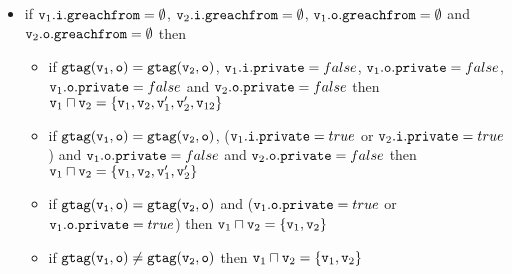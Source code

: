 \begin{itemize}
 \item if $\mathtt{v}_1.\mathtt{i}.\mathtt{greachfrom} = \emptyset$, $\mathtt{v}_2.\mathtt{i}.\mathtt{greachfrom} = \emptyset$, $\mathtt{v}_1.\mathtt{o}.\mathtt{greachfrom} = \emptyset$ and $\mathtt{v}_2.\mathtt{o}.\mathtt{greachfrom} = \emptyset$ then 
 \begin{itemize}
 \item if $\tt gtag(\mathtt{v}_1, o) = gtag(\mathtt{v}_2, o)$, $\mathtt{v}_1.\mathtt{i}.\mathtt{private} = false$, $\mathtt{v}_1.\mathtt{o}.\mathtt{private} = false$, $\mathtt{v}_1.\mathtt{o}.\mathtt{private} = false$ and $\mathtt{v}_2.\mathtt{o}.\mathtt{private} = false$ then  $\mathtt{v}_1 \sqcap \mathtt{v}_2 = \{\mathtt{v}_1,\mathtt{v}_2,\mathtt{v}_1',\mathtt{v}_2',\mathtt{v}_{12}\}$ %
    
    
   \item if $\tt gtag(\mathtt{v}_1, o) = gtag(\mathtt{v}_2, o)$, ($\mathtt{v}_1.\mathtt{i}.\mathtt{private} = true$ or $\mathtt{v}_2.\mathtt{i}.\mathtt{private} = true$) and $\mathtt{v}_1.\mathtt{o}.\mathtt{private} = false$ and $\mathtt{v}_2.\mathtt{o}.\mathtt{private} = false$ then  $\mathtt{v}_1 \sqcap \mathtt{v}_2 = \{\mathtt{v}_1,\mathtt{v}_2,\mathtt{v}_1',\mathtt{v}_2'\}$  

  \item if $\tt gtag(\mathtt{v}_1, o) = gtag(\mathtt{v}_2, o)$ and ($\mathtt{v}_1.\mathtt{o}.\mathtt{private} = true$ or $\mathtt{v}_1.\mathtt{o}.\mathtt{private} = true$) then  $\mathtt{v}_1 \sqcap \mathtt{v}_2 = \{\mathtt{v}_1,\mathtt{v}_2\}$ 

    \item if $\tt gtag(\mathtt{v}_1, o) \neq gtag(\mathtt{v}_2, o)$ then $\mathtt{v}_1 \sqcap \mathtt{v}_2 = \{\mathtt{v}_1,\mathtt{v}_2\}$
 \end{itemize}
 
 \end{itemize}


